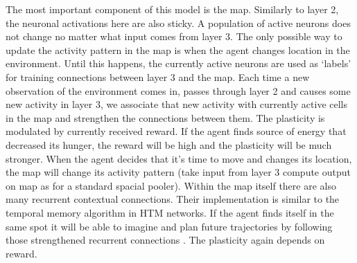 \documentclass[12pt]{article}
\begin{document}
The most important component of this model is the map. Similarly to layer 2, the neuronal activations here are also sticky. A population of active neurons does not change no matter what input comes from layer 3. The only possible way to update the activity pattern in the map is when the agent changes location in the environment. Until this happens, the currently active neurons are used as `labels' for training connections between layer 3 and the map. Each time a new observation of the environment comes in, passes through layer 2 and causes some new activity in layer 3, we associate that new activity with currently active cells in the map and strengthen the connections between them. The plasticity is modulated by currently received reward. If the agent finds source of energy that decreased its hunger, the reward will be high and the plasticity will be much stronger. When the agent decides that it's time to move and changes its location, the map will change its activity pattern (take input from layer 3 compute output on map as for a standard spacial pooler). Within the map itself there are also many recurrent contextual connections. Their implementation is similar to the temporal memory algorithm\cite{htm_sequence_learning} in HTM networks. If the agent finds itself in the same spot it will be able to imagine and plan future trajectories by following those strengthened recurrent connections \cite{future-paths}. The plasticity again depends on reward.
\end{document}
